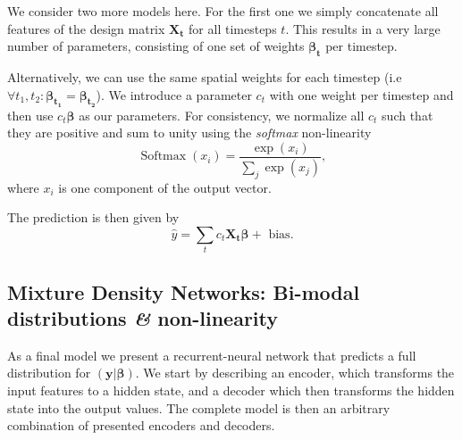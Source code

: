 \documentclass[nobib, a4paper]{tufte-handout}
\begin{document}
We consider two more models here.
For the first one we simply concatenate all features of the design matrix \(\bm{X_t}\) for all timesteps \(t\).
This results in a very large number of parameters, consisting of one set of weights \(\bm{\beta_t}\) per timestep.

Alternatively, we can use the same spatial weights for each timestep (i.e\ \( \forall t_1, t_2: \bm{\beta_{t_1}} = \bm{\beta_{t_2}}\)).
We introduce a parameter \(c_t\) with one weight per timestep and then use $c_t \bm{\beta}$ as our parameters.
For consistency, we normalize all \(c_t\) such that they are positive and sum to unity using the \textit{softmax} non-linearity
\begin{equation}\label{eq:softmax}
\operatorname{Softmax} (x_i) = \frac{\exp (x_i)}{\sum_j \exp (x_j)},
\end{equation}
where \(x_i\) is one component of the output vector.

The prediction is then given by
\begin{equation*}
  \hat{y} = \sum_t c_t \bm{X_t} \bm{\beta} + \text{ bias}.
\end{equation*}

\subsection{Mixture Density Networks: Bi-modal distributions \textit{\&} non-linearity}
As a final model we present a recurrent-neural network that predicts a full distribution for \(\left( \bm{y} | \bm{\beta} \right)\).
We start by describing an encoder, which transforms the input features to a hidden state, and a decoder which then transforms the hidden state into the output values.
The complete model is then an arbitrary combination of presented encoders and decoders.
\end{document}
